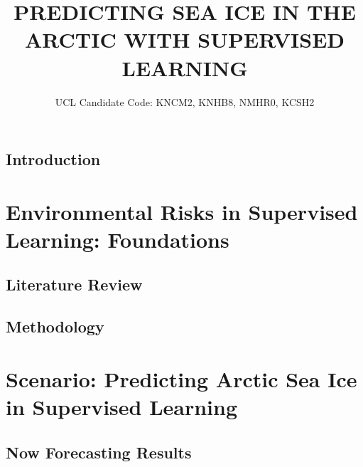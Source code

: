 \documentclass[12pt]{report}
\begin{document}
\title{PREDICTING SEA ICE IN THE ARCTIC WITH SUPERVISED LEARNING}
\author{UCL Candidate Code: KNCM2, KNHB8, NMHR0, KCSH2}



\beforepreface
\hypersetup{linkcolor=magenta}

\hypersetup{linkcolor=.}

\afterpreface
\hypersetup{linkcolor=magenta}



\chapter{Introduction}                          %
\label{Chapter1:Intro}




\part{Environmental Risks in Supervised Learning: Foundations}

\chapter{Literature Review}                     %
\label{Chapter2:Review}



\chapter{Methodology}                           %
\label{Chapter3:Method}







\part{Scenario: Predicting Arctic Sea Ice in Supervised Learning}


\chapter{Now Forecasting Results}   %
\label{Chapter4:Now-Results}







\end{document}
